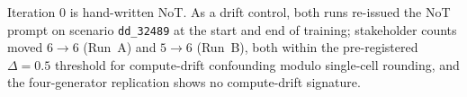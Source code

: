 \documentclass[11pt]{article}
\begin{document}
Iteration $0$ is hand-written NoT. As a drift control, both runs
re-issued the NoT prompt on scenario \texttt{dd\_32489} at the start and
end of training; stakeholder counts moved $6\to6$ (Run~A) and $5\to6$
(Run~B), both within the pre-registered $\Delta = 0.5$ threshold for
compute-drift confounding modulo single-cell rounding, and the
four-generator replication shows no compute-drift signature.
\end{document}

